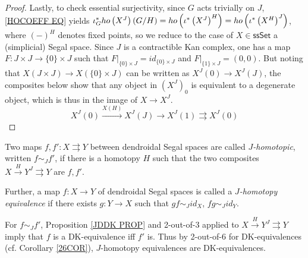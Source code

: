 \documentclass[a4paper,10pt
 ,draft
]{article}%
\begin{document}
\begin{proof}
Lastly, to check essential surjectivity, 
since $G$ acts trivially on $J$, \eqref{HOCOEFF EQ} yields
$\iota_G^{\**} ho\left( X^J \right)(G/H)=
ho\left(\iota^{\**}\left(X^J\right)^H\right)=
ho\left(\iota^{\**}\left(X^H\right)^J\right)$,
where $(-)^H$ denotes fixed points,
so we reduce to the case of $X \in \mathsf{ssSet}$ a (simplicial) Segal space.
Since $J$ is a contractible Kan complex,
one has a map 
$F \colon J \times J \to \{0\} \times J$
such that 
$F|_{\{0\}\times J} = id_{\{0\} \times J}$
and
$F|_{\{1\}\times J} = (0,0)$.
But noting that 
$X(J \times J) \to X(\{0\} \times J)$
can be written as 
$X^J(0) \to X^J(J)$, the composites below
show that any object in $\left(X^J\right)_0$ is equivalent to a 
degenerate object, which is thus in the image of $X\to X^J$.
\[
	X^J(0) \xrightarrow{X(H)} 
	X^{J}(J) \to
	X^J(1) \rightrightarrows X^J(0)
\]
%
\end{proof}


\begin{definition}
	Two maps $f,f'\colon X \rightrightarrows Y$ between dendroidal Segal spaces are called \textit{$J$-homotopic}, written $f \sim_J f'$, if
	there is a homotopy $H$ such that
	the two composites
	$X \xrightarrow{H} Y^J \rightrightarrows Y$
	are $f,f'$.
	
	Further, a map $f\colon X \to Y$ of dendroidal Segal spaces is called a \textit{$J$-homotopy equivalence} if there exists $g \colon Y \to X$
	such that $gf \sim_J id_X$, $fg \sim_J id_Y$.
\end{definition}


\begin{remark}
	For $f\sim_J f'$, Proposition \ref{JDDK PROP} and 2-out-of-3 applied to $X \xrightarrow{H} Y^J \rightrightarrows Y$ imply that $f$ is a DK-equivalence iff $f'$ is.
	Thus by 2-out-of-6 for DK-equivalences (cf. Corollary \ref{26COR}), $J$-homotopy equivalences are DK-equivalences.
\end{remark}
\end{document}
